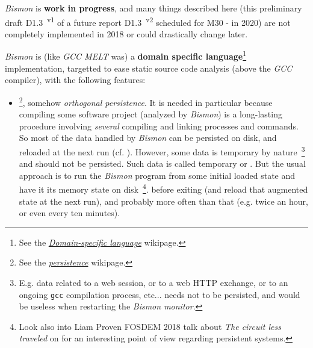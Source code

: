 \textit{Bismon} is \textbf{work in progress}, and many things
described here (this preliminary draft D1.3~\textsuperscript{v1} of a
future report D1.3~\textsuperscript{v2} scheduled for M30 - in 2020)
are not completely implemented in 2018 or could drastically change
later.

\bigskip

\textit{Bismon} is (like \textit{GCC MELT} was) a \textbf{domain
  specific language}\footnote{See the
  \href{https://en.wikipedia.org/wiki/Domain-specific\_language}{\emph{Domain-specific
      language}} wikipage.}   implementation, targetted to ease static
source code analysis (above the \textit{GCC} compiler), with the
following features:

\begin{itemize}

  \item {}\footnote{See the
    \href{https://en.wikipedia.org/wiki/Persistence\_(computer\_science)}{\emph{persistence}}
    wikipage.}, somehow \textit{orthogonal persistence}. It is needed
    in particular because compiling some software project (analyzed by
    \textit{Bismon}) is a long-lasting procedure involving
    \textit{several} compiling and linking processes and commands. So
    most of the data handled by \textit{Bismon} can be persisted on
    disk, and reloaded at the next run
    (cf. \cite{Dearle-2010-orthopersist,
      Dearle:2009:OrthogonalPR}). However, some data is temporary by
    nature~\footnote{E.g. data related to a web session, or to a web
      HTTP exchange, or to an ongoing \texttt{gcc} compilation
      process, etc... needs not to be persisted, and would be useless
      when restarting the \textit{Bismon monitor}.} and should not be
    persisted. Such data is called temporary or
    . But the usual approach is
    to run the \textit{Bismon} program from some initial loaded state
    and have it  its memory state on
    disk~\footnote{Look also into Liam Proven FOSDEM 2018 talk about
      \emph{The circuit less traveled} on
      for an interesting point of view regarding persistent systems.}.
    before exiting (and reload that augmented state at the next run),
    and probably more often than that (e.g. twice an hour, or even
    every ten minutes).


\end{itemize}
